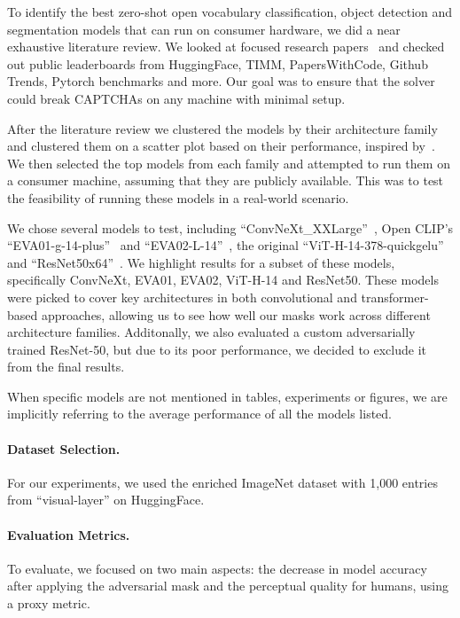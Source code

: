 \documentclass[a4paper, oneside]{discothesis}
\begin{document}
To identify the best zero-shot open vocabulary classification, object detection and segmentation models that can run on consumer hardware, we did a near exhaustive literature review. We looked at focused research papers~\cite{wang2024benchmarking, goldblum2024battle} and checked out public leaderboards from HuggingFace, TIMM, PapersWithCode, Github Trends, Pytorch benchmarks and more. Our goal was to ensure that the solver could break CAPTCHAs on any machine with minimal setup.

After the literature review we clustered the models by their architecture family and clustered them on a scatter plot based on their performance, inspired by~\cite{howard_image_models}. We then selected the top models from each family and attempted to run them on a consumer machine, assuming that they are publicly available. This was to test the feasibility of running these models in a real-world scenario.

We chose several models to test, including ``ConvNeXt\_XXLarge''~\cite{Liu_2022_CVPR}, Open CLIP's ``EVA01-g-14-plus''~\cite{Fang_2023_CVPR} and ``EVA02-L-14''~\cite{fang2024eva}, the original ``ViT-H-14-378-quickgelu''~\cite{dosovitskiy2021imageworth16x16words} and ``ResNet50x64''~\cite{He_2015_ICCV}. We highlight results for a subset of these models, specifically ConvNeXt, EVA01, EVA02, ViT-H-14 and ResNet50. These models were picked to cover key architectures in both convolutional and transformer-based approaches, allowing us to see how well our masks work across different architecture families. Additonally, we also evaluated a custom adversarially trained ResNet-50, but due to its poor performance, we decided to exclude it from the final results.

When specific models are not mentioned in tables, experiments or figures, we are implicitly referring to the average performance of all the models listed.

\paragraph{Dataset Selection.}

For our experiments, we used the enriched ImageNet dataset with 1,000 entries from ``visual-layer'' on HuggingFace.

\paragraph{Evaluation Metrics.}

To evaluate, we focused on two main aspects: the decrease in model accuracy after applying the adversarial mask and the perceptual quality for humans, using a proxy metric.
\end{document}
